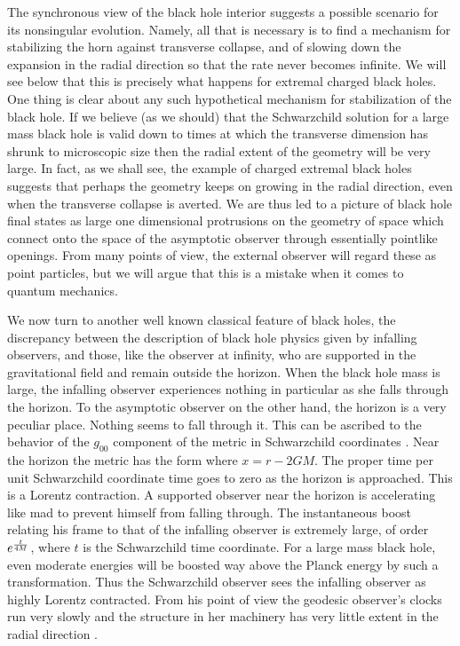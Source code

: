 The synchronous view of the black hole interior suggests a possible scenario
for
its nonsingular evolution.  Namely, all that is necessary is to find a
mechanism
for stabilizing the horn against transverse collapse, and of slowing down the
expansion in the radial direction so that the rate never becomes infinite.
We will see below that this is precisely what happens for extremal charged
black holes.  One thing is clear about any such hypothetical mechanism for
stabilization of the black hole.  If we believe (as we should) that the
Schwarzchild solution
for a large mass black hole is valid down to times at which the transverse
dimension has shrunk
to microscopic size then the radial extent of the geometry will be very
large.
In fact, as we shall see, the example of charged extremal black holes
suggests that perhaps
the geometry keeps on growing in the radial direction, even when the
transverse collapse
is averted.  We are thus led to a picture of black hole final states as large
one dimensional protrusions on the geometry of space which connect onto the
space of the asymptotic
observer through essentially pointlike openings.  From many points of view,
the external
observer will regard these as point particles, but we will argue that this is
a mistake
when it comes to quantum mechanics.

We now turn to another well known classical feature of black holes, the
discrepancy
between the description of black hole physics given by infalling observers,
and those, like
the observer at infinity, who are supported in the gravitational field and
remain outside
the horizon.  When the black hole mass is large, the infalling observer
experiences
nothing in particular as she falls through the horizon.  To the asymptotic
observer
on the other hand, the horizon is a very peculiar place.  Nothing seems to fall
through it.  This can be ascribed to the behavior of the $g_{00}$ component
of the
metric in Schwarzchild coordinates .  Near the horizon the metric has the form
\eqn{}
where $x = r - 2GM$.  The proper time per unit Schwarzchild coordinate time
goes to zero as
the horizon is approached.  This is a Lorentz contraction.  A supported
observer near the
horizon is accelerating like mad to prevent himself from falling through.
The instantaneous boost
relating his frame to that of the infalling observer is extremely large,
of order $e^{t\over 4M}$, where $t$ is the Schwarzchild time
coordinate.
For a large mass black hole, even moderate
energies will be boosted way above the Planck energy by such a transformation.
Thus the
Schwarzchild observer sees the infalling
observer as highly Lorentz contracted.  From his point of view the geodesic
observer's
clocks run very slowly and the structure in her machinery has very little
extent in the radial
direction .

